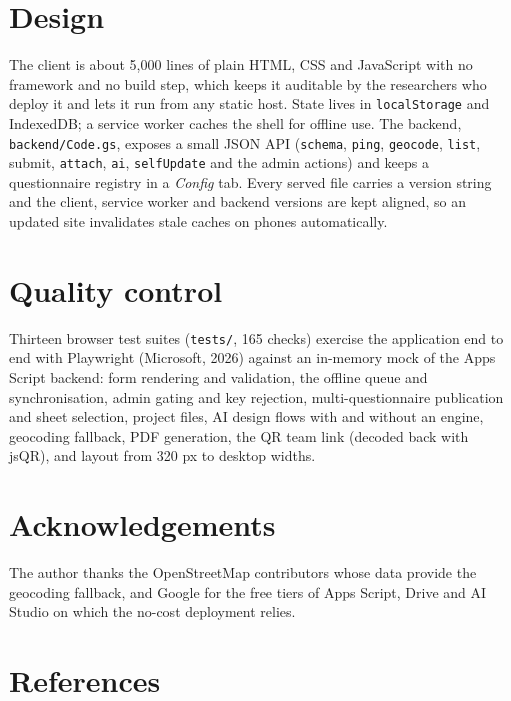 \documentclass[10pt,a4paper,onecolumn]{article}
\begin{document}
\section{Design}\label{design}

The client is about 5,000 lines of plain HTML, CSS and JavaScript with
no framework and no build step, which keeps it auditable by the
researchers who deploy it and lets it run from any static host. State
lives in \texttt{localStorage} and IndexedDB; a service worker caches
the shell for offline use. The backend, \texttt{backend/Code.gs},
exposes a small JSON API (\texttt{schema}, \texttt{ping},
\texttt{geocode}, \texttt{list}, submit, \texttt{attach}, \texttt{ai},
\texttt{selfUpdate} and the admin actions) and keeps a questionnaire
registry in a \emph{Config} tab. Every served file carries a version
string and the client, service worker and backend versions are kept
aligned, so an updated site invalidates stale caches on phones
automatically.

\section{Quality control}\label{quality-control}

Thirteen browser test suites (\texttt{tests/}, 165 checks) exercise the
application end to end with Playwright (Microsoft, 2026) against an
in-memory mock of the Apps Script backend: form rendering and
validation, the offline queue and synchronisation, admin gating and key
rejection, multi-questionnaire publication and sheet selection, project
files, AI design flows with and without an engine, geocoding fallback,
PDF generation, the QR team link (decoded back with jsQR), and layout
from 320 px to desktop widths.

\section{Acknowledgements}\label{acknowledgements}

The author thanks the OpenStreetMap contributors whose data provide the
geocoding fallback, and Google for the free tiers of Apps Script, Drive
and AI Studio on which the no-cost deployment relies.

\section*{References}\label{references}
\end{document}
